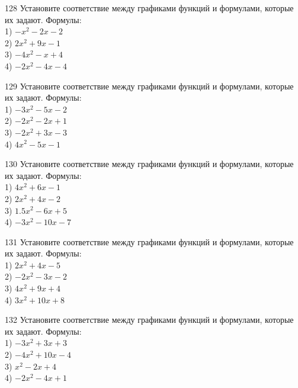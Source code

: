 \documentclass[4apaper]{article}
\begin{document}
\begin{taskBN}{128}
Установите соответствие между графиками функций и формулами, которые их задают. Формулы: \\1) $-x^2-2x-2$\\2) $2x^2+9x-1$\\3) $-4x^2-x+4$\\4) $-2x^2-4x-4$
\end{taskBN}

\begin{taskBN}{129}
Установите соответствие между графиками функций и формулами, которые их задают. Формулы: \\1) $-3x^2-5x-2$\\2) $-2x^2-2x+1$\\3) $-2x^2+3x-3$\\4) $4x^2-5x-1$
\end{taskBN}

\begin{taskBN}{130}
Установите соответствие между графиками функций и формулами, которые их задают. Формулы: \\1) $4x^2+6x-1$\\2) $2x^2+4x-2$\\3) $1.5x^2-6x+5$\\4) $-3x^2-10x-7$
\end{taskBN}

\begin{taskBN}{131}
Установите соответствие между графиками функций и формулами, которые их задают. Формулы: \\1) $2x^2+4x-5$\\2) $-2x^2-3x-2$\\3) $4x^2+9x+4$\\4) $3x^2+10x+8$
\end{taskBN}

\begin{taskBN}{132}
Установите соответствие между графиками функций и формулами, которые их задают. Формулы: \\1) $-3x^2+3x+3$\\2) $-4x^2+10x-4$\\3) $x^2-2x+4$\\4) $-2x^2-4x+1$
\end{taskBN}
\end{document}
